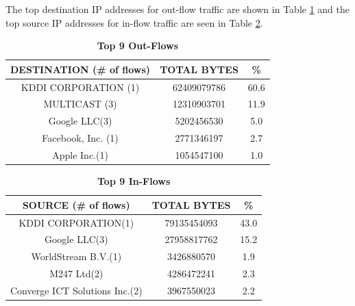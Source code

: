 \documentclass[journal]{IEEE/IEEEtran}
\begin{document}
The top destination IP addresses for out-flow traffic are shown in Table \ref{top-out-flows} and the top source IP addresses for in-flow traffic are seen in Table \ref{top-in-flows}.

\begin{table}[ht]
\centering
\caption{\textbf{Top 9 Out-Flows}}
\label{top-out-flows}
\begin{tabular}{|c|c|c|}
\hline
\textbf{DESTINATION (\# of flows)} 		& \textbf{TOTAL BYTES} 	& \textbf{\%} \\ \hline
	KDDI CORPORATION (1)				&  62409079786			& 60.6        \\ \hline
	MULTICAST (3)						&  12310903701          & 11.9        \\ \hline
	Google LLC(3)						&  5202456530           & 5.0         \\ \hline
	Facebook, Inc. (1)					&  2771346197           & 2.7         \\ \hline	
	Apple Inc.(1)						&  1054547100           & 1.0         \\ \hline
\end{tabular}
\end{table}

\begin{table}[ht]
\centering
\caption{\textbf{Top 9 In-Flows}}
\label{top-in-flows}
\begin{tabular}{|c|c|c|}
\hline
\textbf{SOURCE (\# of flows)} 		& \textbf{TOTAL BYTES} 	& \textbf{\%} \\ \hline
    KDDI CORPORATION(1)				&  79135454093			& 43.0        \\ \hline
    Google LLC(3)					&  27958817762          & 15.2        \\ \hline
    WorldStream B.V.(1)				&  3426880570           & 1.9         \\ \hline
    M247 Ltd(2)						&  4286472241           & 2.3         \\ \hline
    Converge ICT Solutions Inc.(2)	&  3967550023			& 2.2         \\ \hline    
\end{tabular}
\end{table}
\end{document}
